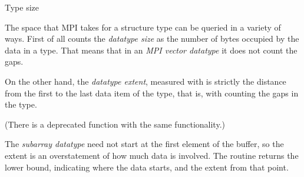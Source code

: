 
 {Type size}

The space that MPI takes for a structure type can be queried in a
variety of ways. First of all  counts the
\emph{datatype size} as the 
number of bytes occupied by the data in a type. That means that in an
\emph{MPI vector datatype} it does not
count the gaps.
%


On the other hand, the \emph{datatype
  extent}, measured with
is strictly the distance from the
first to the last data item of the type, that is, with counting the
gaps in the type.
%
%

(There is a deprecated function  with the same
functionality.)

The \emph{subarray datatype} need not
start at the first element of the buffer, so the extent is an
overstatement of how much data is involved. The routine
 returns the lower bound,
indicating where the data starts, and the extent from that point.

\begin{comment}
  Suppose we implement gather (see also Section Gather ) as a spanning
  tree implemented on top of point-to-point routines. Since the receive
  buffer is only valid on the root process, one will need to allocate
  some temporary space for receiving data on intermediate
  nodes. However, the datatype extent cannot be used as an estimate of
  the amount of space that needs to be allocated, if the user has
  modified the extent, for example by using MPI_TYPE_CREATE_RESIZED. The
  functions MPI_TYPE_GET_TRUE_EXTENT and MPI_TYPE_GET_TRUE_EXTENT_X are
  provided which return the true extent of the datatype.
\end{comment}

